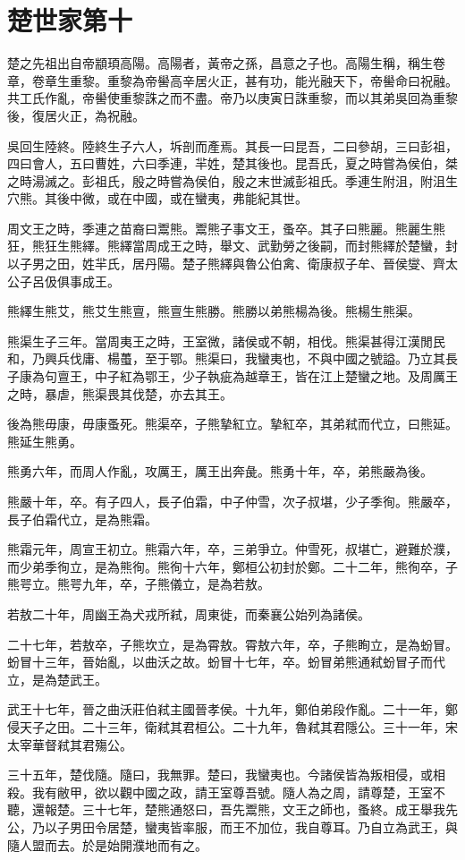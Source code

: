 \chapter{楚世家第十}

楚之先祖出自帝顓頊高陽。高陽者，黃帝之孫，昌意之子也。高陽生稱，稱生卷章，卷章生重黎。重黎為帝嚳高辛居火正，甚有功，能光融天下，帝嚳命曰祝融。共工氏作亂，帝嚳使重黎誅之而不盡。帝乃以庚寅日誅重黎，而以其弟吳回為重黎後，復居火正，為祝融。

吳回生陸終。陸終生子六人，坼剖而產焉。其長一曰昆吾，二曰參胡，三曰彭祖，四曰會人，五曰曹姓，六曰季連，羋姓，楚其後也。昆吾氏，夏之時嘗為侯伯，桀之時湯滅之。彭祖氏，殷之時嘗為侯伯，殷之末世滅彭祖氏。季連生附沮，附沮生穴熊。其後中微，或在中國，或在蠻夷，弗能紀其世。

周文王之時，季連之苗裔曰鬻熊。鬻熊子事文王，蚤卒。其子曰熊麗。熊麗生熊狂，熊狂生熊繹。熊繹當周成王之時，舉文、武勤勞之後嗣，而封熊繹於楚蠻，封以子男之田，姓羋氏，居丹陽。楚子熊繹與魯公伯禽、衛康叔子牟、晉侯燮、齊太公子呂伋俱事成王。

熊繹生熊艾，熊艾生熊亶，熊亶生熊勝。熊勝以弟熊楊為後。熊楊生熊渠。

熊渠生子三年。當周夷王之時，王室微，諸侯或不朝，相伐。熊渠甚得江漢閒民和，乃興兵伐庸、楊蠆，至于鄂。熊渠曰，我蠻夷也，不與中國之號謚。乃立其長子康為句亶王，中子紅為鄂王，少子執疵為越章王，皆在江上楚蠻之地。及周厲王之時，暴虐，熊渠畏其伐楚，亦去其王。

後為熊毋康，毋康蚤死。熊渠卒，子熊摯紅立。摯紅卒，其弟弒而代立，曰熊延。熊延生熊勇。

熊勇六年，而周人作亂，攻厲王，厲王出奔彘。熊勇十年，卒，弟熊嚴為後。

熊嚴十年，卒。有子四人，長子伯霜，中子仲雪，次子叔堪，少子季徇。熊嚴卒，長子伯霜代立，是為熊霜。

熊霜元年，周宣王初立。熊霜六年，卒，三弟爭立。仲雪死，叔堪亡，避難於濮，而少弟季徇立，是為熊徇。熊徇十六年，鄭桓公初封於鄭。二十二年，熊徇卒，子熊咢立。熊咢九年，卒，子熊儀立，是為若敖。

若敖二十年，周幽王為犬戎所弒，周東徙，而秦襄公始列為諸侯。

二十七年，若敖卒，子熊坎立，是為霄敖。霄敖六年，卒，子熊眴立，是為蚡冒。蚡冒十三年，晉始亂，以曲沃之故。蚡冒十七年，卒。蚡冒弟熊通弒蚡冒子而代立，是為楚武王。

武王十七年，晉之曲沃莊伯弒主國晉孝侯。十九年，鄭伯弟段作亂。二十一年，鄭侵天子之田。二十三年，衛弒其君桓公。二十九年，魯弒其君隱公。三十一年，宋太宰華督弒其君殤公。

三十五年，楚伐隨。隨曰，我無罪。楚曰，我蠻夷也。今諸侯皆為叛相侵，或相殺。我有敝甲，欲以觀中國之政，請王室尊吾號。隨人為之周，請尊楚，王室不聽，還報楚。三十七年，楚熊通怒曰，吾先鬻熊，文王之師也，蚤終。成王舉我先公，乃以子男田令居楚，蠻夷皆率服，而王不加位，我自尊耳。乃自立為武王，與隨人盟而去。於是始開濮地而有之。

